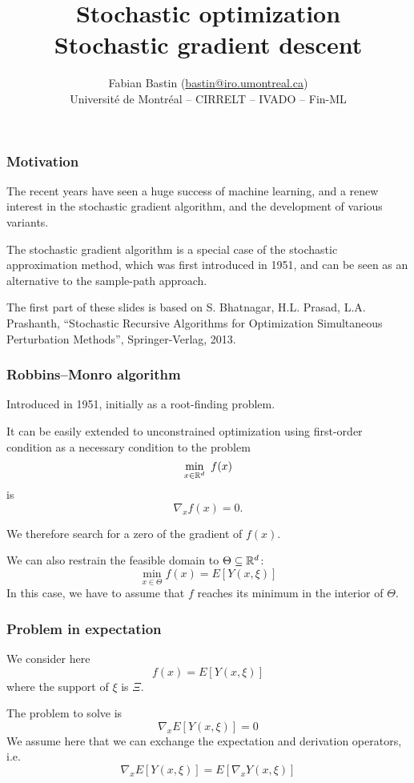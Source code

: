 \documentclass{beamer}
\title[SA vs SAA]{Stochastic optimization\\Stochastic gradient descent}
\author[Fabian Bastin]{Fabian Bastin (\url{bastin@iro.umontreal.ca}) \\ Université de Montréal -- CIRRELT -- IVADO -- Fin-ML}
\date{}
\begin{document}

\frame{\titlepage}

\begin{frame}
\frametitle{Motivation}

The recent years have seen a huge success of machine learning, and a renew interest in the stochastic gradient algorithm, and the development of various variants.

\mbox{}

The stochastic gradient algorithm is a special case of the stochastic approximation method, which was first introduced in 1951, and can be seen as an alternative to the sample-path approach.

\mbox{}

The first part of these slides is based on
S. Bhatnagar, H.L. Prasad, L.A. Prashanth, ``Stochastic Recursive Algorithms for Optimization
Simultaneous Perturbation Methods'', Springer-Verlag, 2013.

\end{frame}

\begin{frame}
\frametitle{Robbins–Monro algorithm}

Introduced in 1951, initially as a root-finding problem.

\mbox{}

It can be easily extended to unconstrained optimization using first-order condition as a necessary condition to the problem
$$
\min_{x \in {\mathbb{R}}^d} \ f(x)
$$
is
$$
\nabla_x f(x) = 0.
$$

\mbox{}

We therefore search for a zero of the gradient of $f(x)$.

\mbox{}

We can also restrain the feasible domain to $\Theta \subseteq {\mathbb{R}}^d$:
$$
\min_{x \in \Theta} f(x) = E[Y(x,\xi)]
$$
In this case, we have to assume that $f$ reaches its minimum in the interior of $\Theta$.

\end{frame}

\begin{frame}
\frametitle{Problem in expectation}

We consider here
$$
f(x) = E[Y(x,\xi)]
$$
where the support of $\xi$ is $\Xi$.

\mbox{}

The problem to solve is
$$
\nabla_x E[Y(x,\xi)] = 0
$$
We assume here that we can exchange the expectation and derivation operators, i.e.
$$
\nabla_x E[Y(x,\xi)] = E[\nabla_x Y(x,\xi)]
$$

\end{frame}
\end{document}
